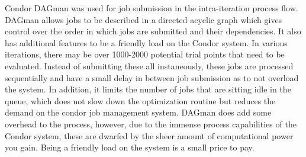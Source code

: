 Condor DAGman was used for job submission in the intra-iteration process flow.  DAGman allows jobs to be described in a directed acyclic graph which gives control over the order in which jobs are submitted and their dependencies.  It also has additional features to be a friendly load on the Condor system.  In various iterations, there may be over 1000-2000 potential trial points that need to be evaluated.  Instead of submitting these all instaneously, these jobs are processed sequentially and have a small delay in between job submission as to not overload the system.  In addition, it limits the number of jobs that are sitting idle in the queue, which does not slow down the optimization routine but reduces the demand on the condor job management system.  DAGman does add some overhead to the process, however, due to the immense process capabilities of the Condor system, these are dwarfed by the sheer amount of computational power you gain.  Being a friendly load on the system is a small price to pay.

